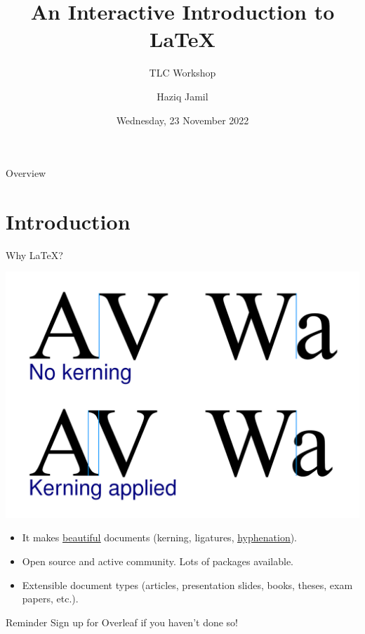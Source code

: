 \documentclass[,aspectratio=43]{beamer}
\author{Haziq Jamil}
\title{An Interactive Introduction to \LaTeX}
\subtitle{TLC Workshop}
\institute{Mathematical Sciences, Faculty of Science, UBD\\
\url{https://haziqj.ml/learn-latex}}
\date{Wednesday, 23 November 2022}
\begin{document}
\begin{frame}
	\titlepage
\end{frame}

\begin{frame}[allowframebreaks=0.8]{Overview}
    \begin{multicols}{2}
  \tableofcontents
  \end{multicols}
  \end{frame}


\hypertarget{introduction}{%
\section{Introduction}\label{introduction}}

\begin{frame}{Why \LaTeX?}
\protect\hypertarget{why}{}
\vspace{-0.5em}

\begin{center}\includegraphics[width=1\linewidth,height=0.5\textheight]{figure/kerning} \end{center}

\vspace{-0.5em}

\begin{itemize}
\item
  It makes \href{https://nitens.org/w/latex/}{\underline{beautiful}}
  documents (kerning, ligatures,
  \href{https://tex.stackexchange.com/questions/110133/visual-comparison-between-latex-and-word-output-hyphenation-typesetting-ligat}{\underline{hyphenation}}).
\item
  Open source and active community. Lots of packages available.
\item
  Extensible document types (articles, presentation slides, books,
  theses, exam papers, etc.).
\end{itemize}

\begin{alertblock}{Reminder}
Sign up for Overleaf if you haven't done so!

\end{alertblock}
\end{frame}
\end{document}
